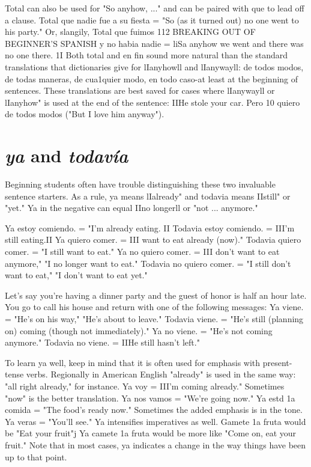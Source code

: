 \documentclass[14pt,a4paper,oneside]{memoir}
\newcommand{\bsk}{\vspace{20pt}}
\begin{document}
Total can also be used for "So anyhow, ..." and can be paired
with que to lead off a clause. Total que nadie fue a su fiesta = "So (as
it turned out) no one went to his party." Or, slangily, Total que fuimos
112 BREAKING OUT OF BEGINNER'S SPANISH
y no habia nadie = liSa anyhow we went and there was no one there. 1I
Both total and en fin sound more natural than the standard translations that dictionaries give for lIanyhowll and lIanywayll: de todos modos, de todas maneras, de cua1quier modo, en todo caso-at least at
the beginning of sentences. These translations are best saved for cases
where lIanywayll or lIanyhow" is used at the end of the sentence:
IIHe stole your car. Pero 10 quiero de todos modos ("But I love him
anyway").

\section{\emph{ya} and \emph{todavía}}

Beginning students often have trouble distinguishing these
two invaluable sentence starters. As a rule, ya means lIalready" and todavia means IIstill" or "yet." Ya in the negative can equal IIno longerll
or "not ... anymore."

\bsk

Ya estoy comiendo. = "I'm already eating. II
Todavia estoy comiendo. = III'm still eating.II
Ya quiero comer. = III want to eat already (now)."
Todavia quiero comer. = "I still want to eat."
Ya no quiero comer. = III don't want to eat anymore,"
"I no longer want to eat."
Todavia no quiero comer. = "I still don't want to eat,"
"I don't want to eat yet."

\bsk

Let's say you're having a dinner party and the guest of honor is half an
hour late. You go to call his house and return with one of the following
messages:
Ya viene. = "He's on his way," "He's about to leave."
Todavia viene. = "He's still (planning on) coming (though not
immediately)."
Ya no viene. = "He's not coming anymore."
Todavia no viene. = IIHe still hasn't left."

\bsk

To learn ya well, keep in mind that it is often used for emphasis with
present-tense verbs. Regionally in American English "already" is used
in the same way: "all right already," for instance. Ya voy = III'm coming already." Sometimes "now" is the better translation. Ya nos vamos
= "We're going now." Ya estd 1a comida = "The food's ready now."
Sometimes the added emphasis is in the tone. Ya veras = "You'll see."
Ya intensifies imperatives as well. Gamete 1a fruta would be "Eat your
fruit"j Ya camete 1a fruta would be more like "Come on, eat your
fruit." Note that in most cases, ya indicates a change in the way things
have been up to that point.
\end{document}
